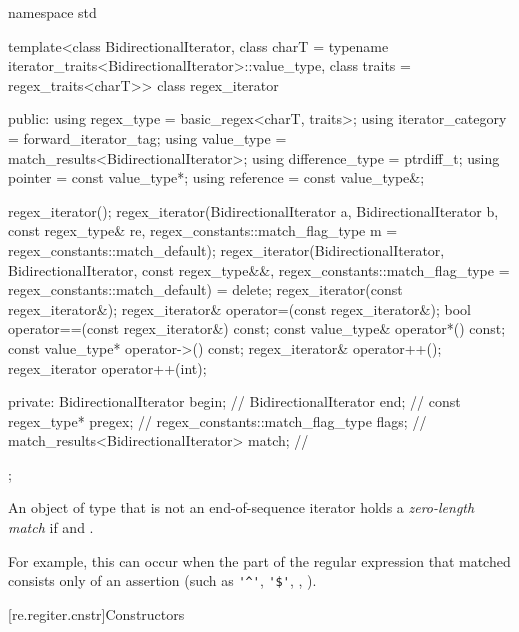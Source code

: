 \begin{codeblock}
namespace std {
  template<class BidirectionalIterator,
            class charT = typename iterator_traits<BidirectionalIterator>::value_type,
            class traits = regex_traits<charT>>
    class regex_iterator {
    public:
      using regex_type        = basic_regex<charT, traits>;
      using iterator_category = forward_iterator_tag;
      using value_type        = match_results<BidirectionalIterator>;
      using difference_type   = ptrdiff_t;
      using pointer           = const value_type*;
      using reference         = const value_type&;

      regex_iterator();
      regex_iterator(BidirectionalIterator a, BidirectionalIterator b,
                     const regex_type& re,
                     regex_constants::match_flag_type m = regex_constants::match_default);
      regex_iterator(BidirectionalIterator, BidirectionalIterator,
                     const regex_type&&,
                     regex_constants::match_flag_type = regex_constants::match_default) = delete;
      regex_iterator(const regex_iterator&);
      regex_iterator& operator=(const regex_iterator&);
      bool operator==(const regex_iterator&) const;
      const value_type& operator*() const;
      const value_type* operator->() const;
      regex_iterator& operator++();
      regex_iterator operator++(int);

    private:
      BidirectionalIterator                begin;               // \expos
      BidirectionalIterator                end;                 // \expos
      const regex_type*                    pregex;              // \expos
      regex_constants::match_flag_type     flags;               // \expos
      match_results<BidirectionalIterator> match;               // \expos
    };
}
\end{codeblock}

\pnum
{}%
An object of type  that is not an end-of-sequence iterator
holds a \textit{zero-length match} if  and
.
\begin{note}
For
example, this can occur when the part of the regular expression that
matched consists only of an assertion (such as \verb|'^'|, \verb|'$'|,
, ).
\end{note}

[re.regiter.cnstr]{Constructors}

